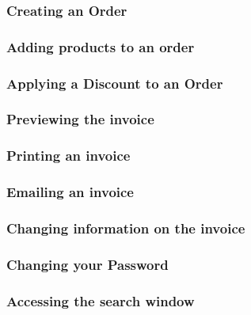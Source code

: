 \pagebreak
\subsubsection{Creating an Order}
\label{fig:Creating an Order}


\pagebreak
\subsubsection{Adding products to an order}
\label{fig:Adding products to an order}


\pagebreak
\subsubsection{Applying a Discount to an Order}
\label{fig:Applying a Discount to an Order}


\pagebreak
\subsubsection{Previewing the invoice}
\label{fig:Previewing the invoice}


\pagebreak
\subsubsection{Printing an invoice}
\label{fig:Printing an invoice}


\pagebreak
\subsubsection{Emailing an invoice}
\label{fig:Emailing an invoice}


\pagebreak
\subsubsection{Changing information on the invoice}
\label{fig:Changing information on the invoice}


\pagebreak
\subsubsection{Changing your Password}
\label{fig:Changing your Password}


\pagebreak
\subsubsection{Accessing the search window}
\label{fig:Accessing the search window}




